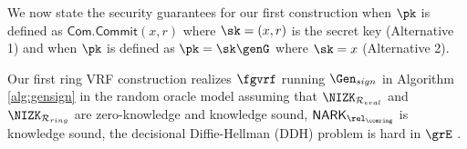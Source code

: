 We now state the security guarantees for our first construction when $ \pk $ is defined as $ \mathsf{Com}.\mathsf{Commit}(x,r) $ where $ \sk = (x, r) $ is the secret key (Alternative 1) and  when $ \pk $ is defined as $ \pk = \sk\genG $ where $ \sk = x $  (Alternative 2).
\begin{theorem}\label{thm:firstprotocol}
	Our first ring VRF construction realizes $ \fgvrf $ running $ \Gen_{sign} $ in Algorithm \ref{alg:gensign} in the random oracle model assuming that $ \NIZK_{\mathcal{R}_{eval}} $ and $ \NIZK_{\mathcal{R}_{ring}}$ are zero-knowledge and knowledge sound, $ \NARK_{\relcomring} $ is knowledge sound, the decisional Diffie-Hellman (DDH) problem is hard in $ \grE  $ . 
\end{theorem}

